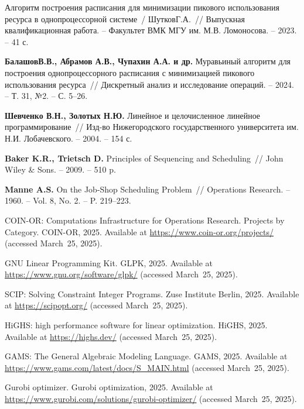 \begin{thebibliography}{}

Алгоритм построения расписания для минимизации пикового использования ресурса в однопроцессорной системе~/ Шутков\;Г.\;А.~// Выпускная квалификационная работа. – Факультет ВМК МГУ им. М.В. Ломоносова. – 2023. – 41 с.

\textbf{Балашов\;В.\;В., Абрамов \;А.\;В., Чупахин \;А.\;А. и др.} Муравьиный алгоритм
для построения однопроцессорного расписания с минимизацией пикового
использования ресурса~// Дискретный анализ и исследование операций. –
2024. – Т. 31, №2. – С. 5–26.

\textbf{Шевченко \;В.\;Н., Золотых \;Н.\;Ю.} Линейное и целочисленное линейное
программирование~// Изд-во Нижегородского государственного
университета им. Н.И. Лобачевского. – 2004. – 154 с.

\textbf{Baker \;K.\;R., Trietsch \;D.} Principles of Sequencing and Scheduling~// John Wiley \& Sons. – 2009. – 510 p.

\textbf{Manne \;A.\;S.} On the Job-Shop Scheduling Problem~// Operations Research. –
1960. – Vol. 8, No. 2. – P. 219–223.

COIN-OR: Computations Infrastructure for Operations Research. Projects by Category. COIN-OR, 2025. Available at \url{https://www.coin-or.org/projects/} (accessed March~25, 2025).

GNU Linear Programming Kit. GLPK, 2025. Available at \url{https://www.gnu.org/software/glpk/} (accessed March~25, 2025).

SCIP: Solving Constraint Integer Programs. Zuse Institute Berlin, 2025. Available at \url{https://scipopt.org/} (accessed March~25, 2025).

HiGHS: high performance software
for linear optimization. HiGHS, 2025. Available at \url{https://highs.dev/} (accessed March~25, 2025).

GAMS: The General Algebraic Modeling Language. GAMS, 2025. Available at \url{https://www.gams.com/latest/docs/S\_MAIN.html} (accessed March~25, 2025).

Gurobi optimizer. Gurobi optimization, 2025. Available at \url{https://www.gurobi.com/solutions/gurobi-optimizer/} (accessed March~25, 2025).


\end{thebibliography}